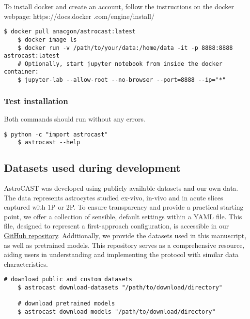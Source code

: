 To install docker and create an account, follow the instructions on the docker webpage: https://docs.docker
.com/engine/install/

\begin{lstlisting}[style=bashStyle]
    $ docker pull anacgon/astrocast:latest
    $ docker image ls
    $ docker run -v /path/to/your/data:/home/data -it -p 8888:8888 astrocast:latest
    # Optionally, start jupyter notebook from inside the docker container:
    $ jupyter-lab --allow-root --no-browser --port=8888 --ip="*"
\end{lstlisting}

\subsubsection{Test installation}

Both commands should run without any errors.

\begin{lstlisting}[style=bashStyle]
    $ python -c "import astrocast"
    $ astrocast --help
\end{lstlisting}

\subsection{Datasets used during development}

AstroCAST was developed using publicly available datasets and our own data. The data represents astrocytes studied ex-vivo, in-vivo and in acute slices captured with \ac{1P} or \ac{2P}. To ensure transparency and provide a practical starting point, we offer a collection of sensible, default settings within a YAML file. This file, designed to represent a first-approach configuration, is accessible in our \href{https://github.com/janreising/astroCAST}{GitHub repository}. Additionally, we provide the datasets used in this manuscript, as well as pretrained models. This repository serves as a comprehensive resource, aiding users in understanding and implementing the protocol with similar data characteristics.

\begin{lstlisting}[style=bashStyle]
    # download public and custom datasets
    $ astrocast download-datasets "/path/to/download/directory"

    # download pretrained models
    $ astrocast download-models "/path/to/download/directory"
\end{lstlisting}